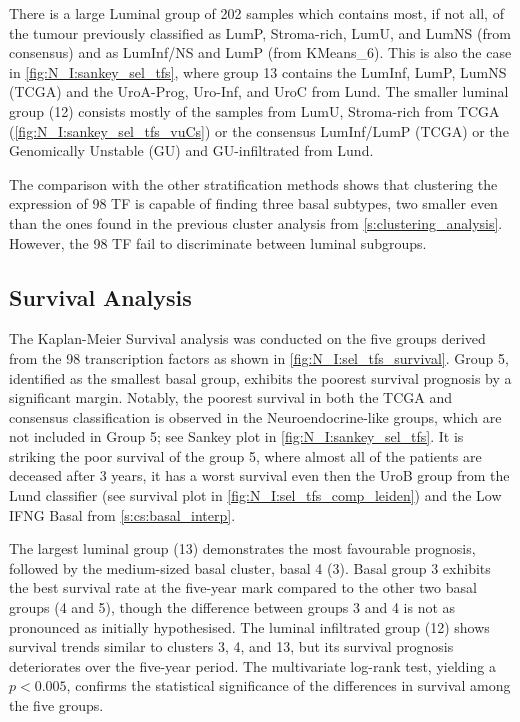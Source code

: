 There is a large Luminal group of 202 samples which contains most, if not all, of the tumour previously classified as LumP, Stroma-rich, LumU, and LumNS (from consensus) and as LumInf/NS and LumP (from KMeans\_6). This is also the case in \cref{fig:N_I:sankey_sel_tfs}, where group 13 contains the LumInf, LumP, LumNS (TCGA) and the UroA-Prog, Uro-Inf, and UroC from Lund. The smaller luminal group (12) consists mostly of the samples from LumU, Stroma-rich from TCGA (\cref{fig:N_I:sankey_sel_tfs_vuCs}) or the consensus LumInf/LumP (TCGA) or the Genomically Unstable (GU) and GU-infiltrated from Lund.

The comparison with the other stratification methods shows that clustering the expression of 98 TF is capable of finding three basal subtypes, two smaller even than the ones found in the previous cluster analysis from \cref{s:clustering_analysis}. However, the 98 TF fail to discriminate between luminal subgroups.

\subsection{Survival Analysis}

The Kaplan-Meier Survival analysis was conducted on the five groups derived from the 98 transcription factors as shown in \cref{fig:N_I:sel_tfs_survival}. Group 5, identified as the smallest basal group, exhibits the poorest survival prognosis by a significant margin. Notably, the poorest survival in both the TCGA and consensus classification is observed in the Neuroendocrine-like groups, which are not included in Group 5; see Sankey plot in \cref{fig:N_I:sankey_sel_tfs}. It is striking the poor survival of the group 5, where almost all of the patients are deceased after 3 years, it has a worst survival even then the UroB group from the Lund classifier (see survival plot in \cref{fig:N_I:sel_tfs_comp_leiden}) and the Low IFNG Basal from \cref{s:cs:basal_interp}.

The largest luminal group (13) demonstrates the most favourable prognosis, followed by the medium-sized basal cluster, basal 4 (3). Basal group 3 exhibits the best survival rate at the five-year mark compared to the other two basal groups (4 and 5), though the difference between groups 3 and 4 is not as pronounced as initially hypothesised. The luminal infiltrated group (12) shows survival trends similar to clusters 3, 4, and 13, but its survival prognosis deteriorates over the five-year period. The multivariate log-rank test, yielding a $p<0.005$, confirms the statistical significance of the differences in survival among the five groups.


